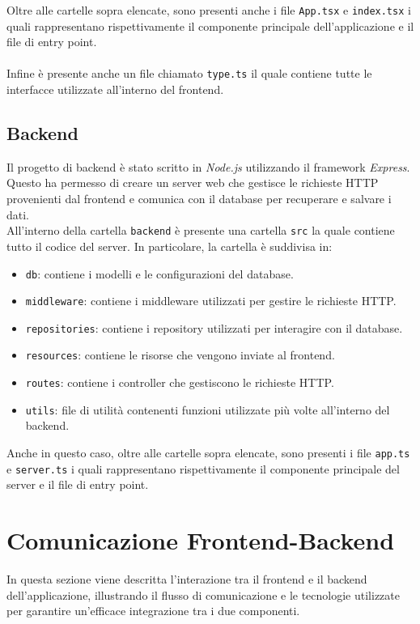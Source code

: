 \documentclass[twoside]{supsistudent}
\begin{document}
Oltre alle cartelle sopra elencate, sono presenti anche i file \texttt{App.tsx} e \texttt{index.tsx} i quali rappresentano rispettivamente il componente principale dell'applicazione e il file di entry point.
\\\\
Infine è presente anche un file chiamato \texttt{type.ts} il quale contiene tutte le interfacce utilizzate all'interno del frontend.

\subsection{Backend}
Il progetto di backend è stato scritto in \textit{Node.js} utilizzando il framework \textit{Express}\cite{expressjs}. Questo ha permesso di creare un server web che gestisce le richieste HTTP provenienti dal frontend e comunica con il database per recuperare e salvare i dati.\\

All'interno della cartella \texttt{backend} è presente una cartella \texttt{src} la quale contiene tutto il codice del server. In particolare, la cartella è suddivisa in:
\begin{itemize}
  \item \texttt{db}: contiene i modelli e le configurazioni del database.
  \item \texttt{middleware}: contiene i middleware utilizzati per gestire le richieste HTTP.
  \item \texttt{repositories}: contiene i repository utilizzati per interagire con il database.
  \item \texttt{resources}: contiene le risorse che vengono inviate al frontend.
  \item \texttt{routes}: contiene i controller che gestiscono le richieste HTTP.
  \item \texttt{utils}: file di utilità contenenti funzioni utilizzate più volte all'interno del backend.
\end{itemize}

Anche in questo caso, oltre alle cartelle sopra elencate, sono presenti i file \texttt{app.ts} e \texttt{server.ts} i quali rappresentano rispettivamente il componente principale del server e il file di entry point.

\section{Comunicazione Frontend-Backend}
In questa sezione viene descritta l'interazione tra il frontend e il backend dell'applicazione, illustrando il flusso di comunicazione e le tecnologie utilizzate per garantire un'efficace integrazione tra i due componenti.
\end{document}

